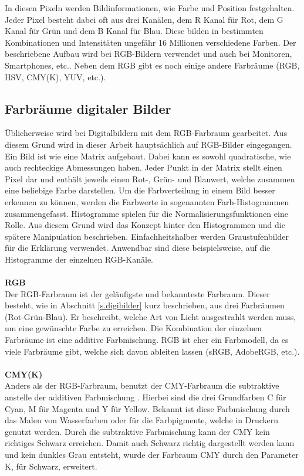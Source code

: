 In diesen Pixeln werden Bildinformationen, wie Farbe und Position festgehalten. Jeder Pixel besteht dabei oft aus drei Kanälen, dem R Kanal für Rot, dem G Kanal für Grün und dem B Kanal für Blau. Diese bilden in bestimmten Kombinationen und Intensitäten ungefähr 16 Millionen verschiedene Farben. Der beschriebene Aufbau wird bei RGB-Bildern verwendet und auch bei Monitoren, Smartphones, etc.. Neben dem RGB gibt es noch einige andere Farbräume \cite[309 ff.]{jahne2013digitale} (RGB, HSV, CMY(K), YUV, etc.).
\subsection{Farbräume digitaler Bilder}\label{s.aufbdigibilder}
Üblicherweise wird bei Digitalbildern mit dem RGB-Farbraum gearbeitet. Aus diesem Grund wird in dieser Arbeit hauptsächlich auf RGB-Bilder eingegangen. Ein Bild ist wie eine Matrix aufgebaut. Dabei kann es sowohl quadratische, wie auch rechteckige Abmessungen haben. Jeder Punkt in der Matrix stellt einen Pixel dar und enthält jeweils einen Rot-, Grün- und Blauwert, welche zusammen eine beliebige Farbe darstellen. Um die Farbverteilung in einem Bild besser erkennen zu können, werden die Farbwerte in sogenannten Farb-Histogrammen zusammengefasst. Histogramme spielen für die Normalisierungsfunktionen eine Rolle. Aus diesem Grund wird das Konzept hinter den Histogrammen und die spätere Manipulation beschrieben. Einfachheitshalber werden Graustufenbilder für die Erklärung verwendet. Anwendbar sind diese beispielsweise, auf die Histogramme der einzelnen RGB-Kanäle.\\\\
\textbf{RGB}\label{s.rgb}\\
Der RGB-Farbraum ist der geläufigste und bekannteste Farbraum. Dieser besteht, wie in Abschnitt \ref{s.digibilder} kurz beschrieben, aus drei Farbräumen (Rot-Grün-Blau). Er beschreibt, welche Art von Licht ausgestrahlt werden muss, um eine gewünschte Farbe zu erreichen. Die Kombination der einzelnen Farbräume ist eine additive Farbmischung. RGB ist eher ein Farbmodell, da es viele Farbräume gibt, welche sich davon ableiten lassen (sRGB, AdobeRGB, etc.).\\\\
\newpage
\textbf{CMY(K)}\label{s.cmy}\\
Anders als der RGB-Farbraum, benutzt der CMY-Farbraum die subtraktive anstelle der additiven Farbmischung \cite[340f.]{jahne2013digitale}. Hierbei sind die drei Grundfarben C für Cyan, M für Magenta und Y für Yellow. Bekannt ist diese Farbmischung durch das Malen von Wasserfarben oder für die Farbpigmente, welche in Druckern genutzt werden. Durch die subtraktive Farbmischung kann der CMY kein richtiges Schwarz erreichen. Damit auch Schwarz richtig dargestellt werden kann und kein dunkles Grau entsteht, wurde der Farbraum CMY durch den Parameter K, für Schwarz, erweitert.\\\\
